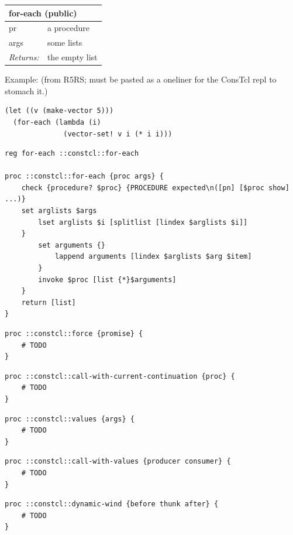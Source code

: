\documentclass[twoside,9pt]{report}
\begin{document}
\begin{tabular}{ |l l| }
\hline
\multicolumn{2}{|l|}{for-each (public)} \\
\hline
pr & a procedure \\
args & some lists \\
\textit{Returns:} & the empty list \\
\hline
\end{tabular}


Example: (from R5RS; must be pasted as a oneliner for the ConsTcl repl to stomach it.)

\noindent\makebox[\linewidth]{\rule{\linewidth}{0.4pt}}
\begin{lstlisting}
(let ((v (make-vector 5)))
  (for-each (lambda (i)
              (vector-set! v i (* i i)))
\end{lstlisting}
\noindent\makebox[\linewidth]{\rule{\linewidth}{0.4pt}}
\noindent\makebox[\linewidth]{\rule{\linewidth}{0.4pt}}
\begin{lstlisting}
reg for-each ::constcl::for-each
 
proc ::constcl::for-each {proc args} {
    check {procedure? $proc} {PROCEDURE expected\n([pn] [$proc show] ...)}
    set arglists $args
        lset arglists $i [splitlist [lindex $arglists $i]]
    }
        set arguments {}
            lappend arguments [lindex $arglists $arg $item]
        }
        invoke $proc [list {*}$arguments]
    }
    return [list]
}
\end{lstlisting}
\noindent\makebox[\linewidth]{\rule{\linewidth}{0.4pt}}
\noindent\makebox[\linewidth]{\rule{\linewidth}{0.4pt}}
\begin{lstlisting}
proc ::constcl::force {promise} {
    # TODO
}
\end{lstlisting}
\noindent\makebox[\linewidth]{\rule{\linewidth}{0.4pt}}
\noindent\makebox[\linewidth]{\rule{\linewidth}{0.4pt}}
\begin{lstlisting}
proc ::constcl::call-with-current-continuation {proc} {
    # TODO
}
\end{lstlisting}
\noindent\makebox[\linewidth]{\rule{\linewidth}{0.4pt}}
\noindent\makebox[\linewidth]{\rule{\linewidth}{0.4pt}}
\begin{lstlisting}
proc ::constcl::values {args} {
    # TODO
}
\end{lstlisting}
\noindent\makebox[\linewidth]{\rule{\linewidth}{0.4pt}}
\noindent\makebox[\linewidth]{\rule{\linewidth}{0.4pt}}
\begin{lstlisting}
proc ::constcl::call-with-values {producer consumer} {
    # TODO
}
\end{lstlisting}
\noindent\makebox[\linewidth]{\rule{\linewidth}{0.4pt}}
\noindent\makebox[\linewidth]{\rule{\linewidth}{0.4pt}}
\begin{lstlisting}
proc ::constcl::dynamic-wind {before thunk after} {
    # TODO
}
\end{lstlisting}
\noindent\makebox[\linewidth]{\rule{\linewidth}{0.4pt}}
\end{document}
